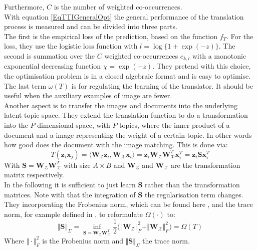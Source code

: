 Furthermore, $C$ is the number of weighted co-occurrences.\\
With equation \eqref{EqTTIGeneralOpt} the general performance of the translation process is measured and can be divided into three parts.\\
The first is the empirical loss of the prediction, based on the function $f_T$.\cite{Qi.2011}
For the loss, they use the logistic loss function with $l = \log\{1+\exp(-z) \}$.
The second is summation over the $C$ weighted co-occurrences $c_{k,l}$ with a monotonic exponential decreasing function $\chi = \exp(-z)$.
They pretend with this choice, the optimisation problem is in a closed algebraic format and is easy to optimise.
The last term $\omega(T)$ is for regulating the learning of the translator.
It should be useful when the auxiliary examples of image are fewer.\cite{Qi.2011}\\
Another aspect is to transfer the images and documents into the underlying latent topic space.
They extend the translation function to do a transformation into the $P$ dimensional space, with $P$ topics, where the inner product of a document and a image representing the weight of a certain topic. In other words how good does the document with the image matching.
This is done via:\cite{Qi.2011}
\begin{equation}
	T(\mathbf{z}_i\mathbf{x}_j) = \langle \mathbf{W}_\mathcal{Z}\mathbf{z}_i,\mathbf{W}_\mathcal{X}\mathbf{x}_i\rangle = \mathbf{z}_i \mathbf{W}_\mathcal{Z}\mathbf{W}_\mathcal{X}^T\mathbf{x}_i^T = \mathbf{z}_i\mathbf{S}\mathbf{x}_i^T 
\end{equation}
With $\mathbf{S} = \mathbf{W}_\mathcal{Z}\mathbf{W}_\mathcal{X}^T$ with size $A \times B$ and $\mathbf{W}_\mathcal{Z}$ and $\mathbf{W}_\mathcal{X}$ are the transformation matrix respectively.\\
In the following it is sufficient to just learn $\mathbf{S}$ rather than the transformation matrices.
Note with that the integration of $\mathbf{S}$ the regularisation term changes.
They incorporating the Frobenius norm, which can be found here \cite{Ma.1994}, and the trace norm, for example defined in \cite{Rennie.2005}, to reformulate $\Omega(\cdot)$ to:
\begin{equation}\label{EqTTITrace}
	\Vert \mathbf{S}\Vert_\Sigma = \inf_{\mathbf{S} = \mathbf{W}_\mathcal{Z} \mathbf{W}_\mathcal{X}^T} \frac{1}{2}\bigg(\Vert\mathbf{W}_\mathcal{Z}\Vert_F^2 + \Vert\mathbf{W}_\mathcal{X}\Vert_F^2 \bigg) = \Omega(T)
\end{equation}
Where $\Vert \cdot \Vert_F^2$ is the Frobenius norm and $\Vert \mathbf{S}\Vert_\Sigma$ the trace norm.\\
